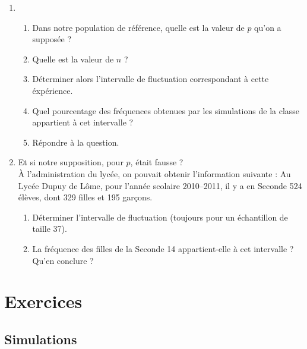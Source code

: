\begin{enumerate}
 \item \begin{enumerate}
	\item Dans notre population de r\'ef\'erence, quelle est la valeur de $p$ qu'on a suppos\'ee ?
	\item Quelle est la valeur de $n$ ?
	\item D\'eterminer alors l'intervalle de fluctuation correspondant \`a cette \'exp\'erience.
	\item Quel pourcentage des fr\'equences obtenues par les simulations de la classe appartient \`a cet intervalle ?
	\item R\'epondre \`a la question.
	\end{enumerate}
 \item Et si notre supposition, pour $p$, \'etait fausse ? \\
    \`A l'administration du lyc\'ee, on pouvait obtenir l'information suivante : \og Au Lyc\'ee Dupuy de L\^ome, pour l'ann\'ee scolaire 2010--2011, il y a en Seconde 524 \'el\`eves, dont 329 filles et 195 gar\c cons\fg.
    \begin{enumerate}
     \item D\'eterminer l'intervalle de fluctuation (toujours pour un \'echantillon de taille 37).
     \item La fr\'equence des filles de la Seconde 14 appartient-elle \`a cet intervalle ? Qu'en conclure ?
    \end{enumerate}
\end{enumerate}





\sautpage

\section{Exercices}

\subsection{Simulations}

